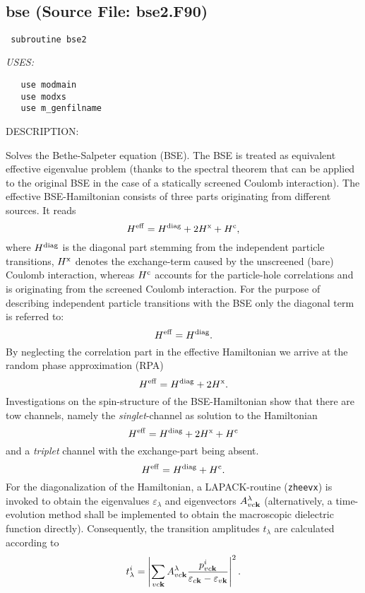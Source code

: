 \documentclass[11pt]{article}
\begin{document}
\mbox{}\hrulefill\ 
 
\subsection{bse (Source File: bse2.F90)}


\begin{verbatim} subroutine bse2\end{verbatim}{\em USES:}
\begin{verbatim}   use modmain
   use modxs
   use m_genfilname\end{verbatim}
{\sf DESCRIPTION:\\ }


     Solves the Bethe-Salpeter equation (BSE). The BSE is treated as equivalent
     effective eigenvalue problem (thanks to the spectral theorem that can
     be applied to the original BSE in the case of a statically screened Coulomb
     interaction). The effective BSE-Hamiltonian consists of three parts
     originating from different sources. It reads
     $$ H^{\rm eff} = H^{\rm diag} + 2H^{\rm x} + H^{\rm c}, $$
     where $H^{\rm diag}$ is the diagonal part stemming from the independent
     particle transitions, $H^{\rm x}$ denotes the exchange-term caused by the
     unscreened (bare) Coulomb interaction, whereas $H^{\rm c}$ accounts for the
     particle-hole correlations and is originating from the screened Coulomb
     interaction.
     For the purpose of describing independent particle transitions with the
     BSE only the diagonal term is referred to:
     $$ H^{\rm eff} = H^{\rm diag}. $$
     By neglecting the correlation part in the effective Hamiltonian we arrive
     at the random phase approximation (RPA)
     $$ H^{\rm eff} = H^{\rm diag} + 2H^{\rm x}. $$
     Investigations on the spin-structure of the BSE-Hamiltonian show that there
     are tow channels, namely the {\it singlet}-channel as solution to the
     Hamiltonian
     $$  H^{\rm eff} = H^{\rm diag} + 2H^{\rm x} + H^{\rm c} $$
     and a {\it triplet} channel with the exchange-part being absent.
     $$ H^{\rm eff} = H^{\rm diag} + H^{\rm c}. $$
     For the diagonalization of the Hamiltonian, a LAPACK-routine ({\tt zheevx})
     is invoked to obtain the eigenvalues $\varepsilon_{\lambda}$ and
     eigenvectors $A^{\lambda}_{vc{\bf k}}$ (alternatively, a time-evolution
     method shall be implemented to obtain the macroscopic dielectric function
     directly).
     Consequently, the transition amplitudes $t_{\lambda}$ are calculated
     according to
     $$ t^{i}_{\lambda} = \left|\sum_{vc{\bf k}} A^{\lambda}_{vc{\bf k}} 
        \frac{ p^{i}_{vc{\bf k}} }{ \varepsilon_{c{\bf k}}- 
                                    \varepsilon_{v{\bf k}} } \right|^2. $$
\end{document}
